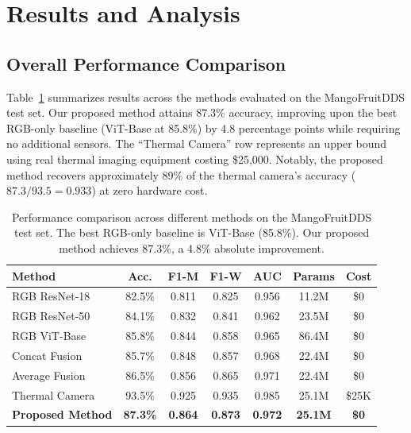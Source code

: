 \documentclass[utf8]{FrontiersinHarvard} %
\begin{document}
\section{Results and Analysis}

\subsection{Overall Performance Comparison}
Table~\ref{tab:performance} summarizes results across the methods evaluated on the MangoFruitDDS test set. Our proposed method attains 87.3\% accuracy, improving upon the best RGB-only baseline (ViT-Base at 85.8\%) by 4.8 percentage points while requiring no additional sensors. The ``Thermal Camera'' row represents an upper bound using real thermal imaging equipment costing \$25,000. Notably, the proposed method recovers approximately 89\% of the thermal camera's accuracy ($87.3/93.5 = 0.933$) at zero hardware cost.

\begin{table}[h!]
    \caption{Performance comparison across different methods on the MangoFruitDDS test set. The best RGB-only baseline is ViT-Base (85.8\%). Our proposed method achieves 87.3\%, a 4.8\% absolute improvement.}
    \label{tab:performance}
    \raggedright
    \scriptsize
    \begin{tabular}{lcccccc}
        \toprule
        \textbf{Method} & \textbf{Acc.} & \textbf{F1-M} & \textbf{F1-W} & \textbf{AUC} & \textbf{Params} & \textbf{Cost} \\
        \midrule
        RGB ResNet-18 & 82.5\% & 0.811 & 0.825 & 0.956 & 11.2M & \$0 \\
        RGB ResNet-50 & 84.1\% & 0.832 & 0.841 & 0.962 & 23.5M & \$0 \\
        RGB ViT-Base & 85.8\% & 0.844 & 0.858 & 0.965 & 86.4M & \$0 \\
        Concat Fusion & 85.7\% & 0.848 & 0.857 & 0.968 & 22.4M & \$0 \\
        Average Fusion & 86.5\% & 0.856 & 0.865 & 0.971 & 22.4M & \$0 \\
        Thermal Camera & 93.5\% & 0.925 & 0.935 & 0.985 & 25.1M & \$25K \\
        \rowcolor{green!20}
        \textbf{Proposed Method} & \textbf{87.3\%} & \textbf{0.864} & \textbf{0.873} & \textbf{0.972} & \textbf{25.1M} & \textbf{\$0} \\
        \bottomrule
    \end{tabular}
\end{table}
\end{document}
